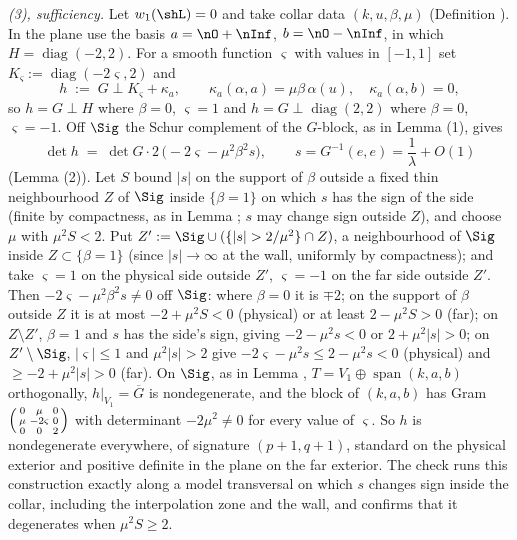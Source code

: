\emph{(3), sufficiency.} Let $w_1(\shL) = 0$ and take collar data $(k, u, \beta, \mu)$ (Definition ). In the plane use the basis $a = \nO + \nInf$, $b = \nO - \nInf$, in which $H = \operatorname{diag}(-2, 2)$. For a smooth function $\varsigma$ with values in $[-1,1]$ set $K_\varsigma := \operatorname{diag}(-2\varsigma, 2)$ and
\[
h \;:=\; G \perp K_\varsigma + \kappa_a, \qquad \kappa_a(\alpha, a) = \mu\beta\,\alpha(u), \quad \kappa_a(\alpha, b) = 0 ,
\]
so $h = G \perp H$ where $\beta = 0$, $\varsigma = 1$ and $h = G \perp \operatorname{diag}(2,2)$ where $\beta = 0$, $\varsigma = -1$. Off $\Sig$ the Schur complement of the $G$-block, as in Lemma (1), gives
\[
\det h \;=\; \det G \cdot 2\,\bigl(-2\varsigma - \mu^2\beta^2 s\bigr), \qquad s = G^{-1}(e,e) = \frac1\lambda + O(1)
\]
(Lemma (2)). Let $S$ bound $|s|$ on the support of $\beta$ outside a fixed thin neighbourhood $Z$ of $\Sig$ inside $\{\beta = 1\}$ on which $s$ has the sign of the side (finite by compactness, as in Lemma ; $s$ may change sign outside $Z$), and choose $\mu$ with $\mu^2 S < 2$. Put $Z' := \Sig \cup (\{|s| > 2/\mu^2\} \cap Z)$, a neighbourhood of $\Sig$ inside $Z \subset \{\beta = 1\}$ (since $|s| \to \infty$ at the wall, uniformly by compactness); and take $\varsigma = 1$ on the physical side outside $Z'$, $\varsigma = -1$ on the far side outside $Z'$. Then $-2\varsigma - \mu^2\beta^2 s \neq 0$ off $\Sig$: where $\beta = 0$ it is $\mp 2$; on the support of $\beta$ outside $Z$ it is at most $-2 + \mu^2 S < 0$ (physical) or at least $2 - \mu^2 S > 0$ (far); on $Z \setminus Z'$, $\beta = 1$ and $s$ has the side's sign, giving $-2 - \mu^2 s < 0$ or $2 + \mu^2|s| > 0$; on $Z' \setminus \Sig$, $|\varsigma| \le 1$ and $\mu^2|s| > 2$ give $-2\varsigma - \mu^2 s \le 2 - \mu^2 s < 0$ (physical) and $\ge -2 + \mu^2|s| > 0$ (far). On $\Sig$, as in Lemma , $T = V_1 \oplus \operatorname{span}(k, a, b)$ orthogonally, $h|_{V_1} = \overline G$ is nondegenerate, and the block of $(k, a, b)$ has Gram $\begin{psmallmatrix} 0 & \mu & 0 \\ \mu & -2\varsigma & 0 \\ 0 & 0 & 2 \end{psmallmatrix}$ with determinant $-2\mu^2 \neq 0$ for every value of $\varsigma$. So $h$ is nondegenerate everywhere, of signature $(p{+}1,q{+}1)$, standard on the physical exterior and positive definite in the plane on the far exterior. The check runs this construction exactly along a model transversal on which $s$ changes sign inside the collar, including the interpolation zone and the wall, and confirms that it degenerates when $\mu^2 S \ge 2$.

